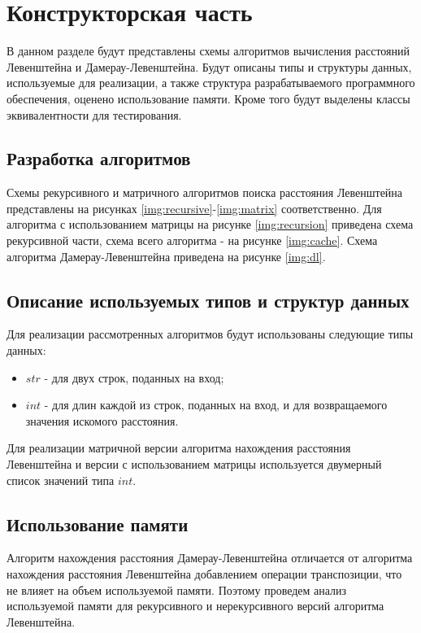 \chapter{Конструкторская часть}

В данном разделе будут представлены схемы алгоритмов вычисления расстояний Левенштейна и Дамерау-Левенштейна. Будут описаны типы и структуры данных, используемые для реализации, а также структура разрабатываемого программного обеспечения, оценено использование памяти. Кроме того будут выделены классы эквивалентности для тестирования.

\section{Разработка алгоритмов}

Схемы рекурсивного и матричного алгоритмов поиска расстояния Левенштейна представлены на рисунках \ref{img:recursive}-\ref{img:matrix} соответственно. Для алгоритма с использованием матрицы на рисунке \ref{img:recursion} приведена схема рекурсивной части, схема всего алгоритма - на рисунке \ref{img:cache}. Схема алгоритма Дамерау-Левенштейна приведена на рисунке \ref{img:dl}.


\section{Описание используемых типов и структур данных}

Для реализации рассмотренных алгоритмов будут использованы следующие типы данных:

\begin{itemize}
	\item $str$ - для двух строк, поданных на вход;
	\item $int$ - для длин каждой из строк, поданных на вход, и для возвращаемого значения искомого расстояния.
\end{itemize}

Для реализации матричной версии алгоритма нахождения расстояния Левенштейна и версии с использованием матрицы используется двумерный список значений типа $int$.

\section{Использование памяти}

Алгоритм нахождения расстояния Дамерау-Левенштейна отличается от алгоритма нахождения расстояния Левенштейна добавлением операции транспозиции, что не влияет на объем используемой памяти. Поэтому проведем анализ используемой памяти для рекурсивного и нерекурсивного версий алгоритма Левенштейна.


